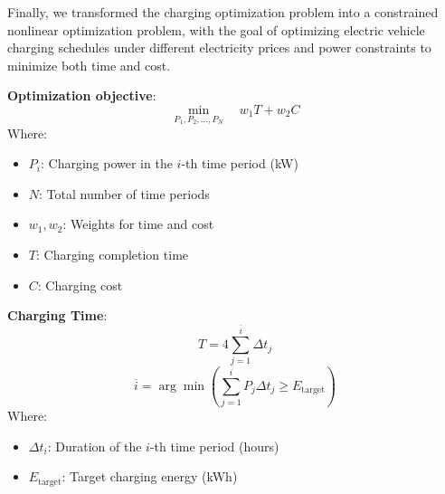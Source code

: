 \documentclass[
english,
ruledheaders=section,%
class=report,%
thesis={type=Report},%
accentcolor=9c,%
custommargins=true,%
marginpar=false,%
parskip=half-,%
fontsize=11pt,%
logofile={img/tuda_logo.pdf}, %
]{tudapub}
\begin{document}

    Finally, we transformed the charging optimization problem into a constrained nonlinear optimization problem, with the goal of optimizing electric vehicle charging schedules under different electricity prices and power constraints to minimize both time and cost.

    \textbf{Optimization objective}:
    \begin{equation}
        \min_{P_1, P_2, \dots, P_N} \quad w_1 T + w_2 C
    \end{equation}
    Where:
    \begin{itemize}
        \item $P_i$: Charging power in the $i$-th time period (kW)
        \item $N$: Total number of time periods
        \item $w_1, w_2$: Weights for time and cost
        \item $T$: Charging completion time
        \item $C$: Charging cost
    \end{itemize}

    \textbf{Charging Time}:
    \begin{equation}
        T = {4}\sum_{j=1}^{\overline{i}} \Delta t_j
    \end{equation}
    \begin{equation}
        \overline{i} = \arg\min \left( \sum_{j=1}^{i} P_j \Delta t_j \geq E_{\text{target}} \right)
    \end{equation}
    Where:
    \begin{itemize}
        \item $\Delta t_i$: Duration of the $i$-th time period (hours)
        \item $E_{\text{target}}$: Target charging energy (kWh)
    \end{itemize}
\end{document}
